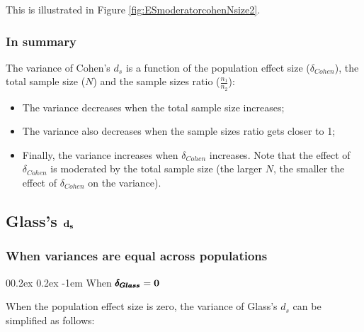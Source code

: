 \documentclass[
  english,
  man,mask]{apa6}
\makeatletter
\providecommand{\tightlist}{%
  \setlength{\itemsep}{0pt}\setlength{\parskip}{0pt}}
\let\oldparagraph\paragraph
\renewcommand{\paragraph}[1]{\oldparagraph{#1}\mbox{}}
\renewcommand{\paragraph}{\@startsection{paragraph}{4}{\parindent}%
  {0\baselineskip \@plus 0.2ex \@minus 0.2ex}%
  {-1em}%
  {\normalfont\normalsize\bfseries\itshape\typesectitle}}
\makeatother
\begin{document}
This is illustrated in Figure \ref{fig:ESmoderatorcohenNsize2}.

\hypertarget{in-summary}{%
\subsubsection{In summary}\label{in-summary}}

The variance of Cohen's \(d_s\) is a function of the population effect size (\(\delta_{Cohen}\)), the total sample size (\(N\)) and the sample sizes ratio (\(\frac{n_1}{n_2}\)):

\begin{itemize}
\tightlist
\item
  The variance decreases when the total sample size increases;\\
\item
  The variance also decreases when the sample sizes ratio gets closer to 1;\\
\item
  Finally, the variance increases when \(\delta_{Cohen}\) increases. Note that the effect of \(\delta_{Cohen}\) is moderated by the total sample size (the larger \(N\), the smaller the effect of \(\delta_{Cohen}\) on the variance).
\end{itemize}

\hypertarget{glasss-bf-d_s}{%
\subsection{\texorpdfstring{Glass's \(\bf d_s\)}{Glass's \textbackslash bf d\_s}}\label{glasss-bf-d_s}}

\hypertarget{when-variances-are-equal-across-populations-1}{%
\subsubsection{When variances are equal across populations}\label{when-variances-are-equal-across-populations-1}}

\hypertarget{when-bf-pmbdelta_glass0}{%
\paragraph{\texorpdfstring{When \(\bf \pmb{\delta_{Glass}}=0\)}{When \textbackslash bf \textbackslash pmb\{\textbackslash delta\_\{Glass\}\}=0}}\label{when-bf-pmbdelta_glass0}}

When the population effect size is zero, the variance of Glass's \(d_s\) can be simplified as follows:
\end{document}
